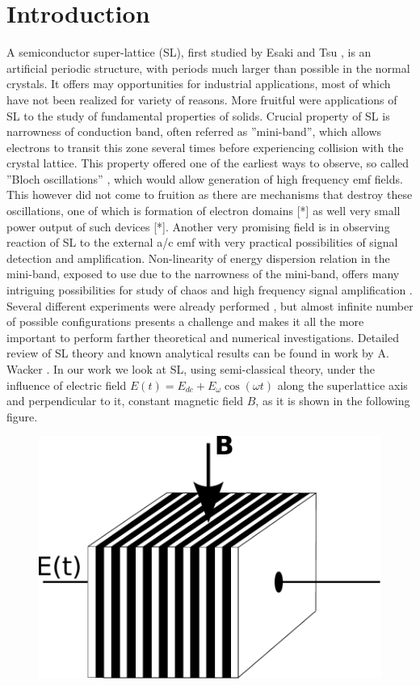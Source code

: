 \documentclass[40pt,letterpaper,physrev]{article}
\begin{document}
  \section{Introduction}  
A semiconductor super-lattice (SL), first studied by Esaki and Tsu \cite{Esaki:70}, is an artificial periodic structure, with periods
much larger than possible in the normal crystals. It offers may opportunities for industrial applications, most of which
have not been realized for variety of reasons. More fruitful were applications of SL to the study of fundamental
properties of solids. Crucial property of SL is narrowness of conduction band, often referred as ”mini-band”, which
allows electrons to transit this zone several times before experiencing collision with the crystal lattice. This property
offered one of the earliest ways to observe, so called ”Bloch oscillations” \cite{BLOCH}, which would allow generation of
high frequency emf fields. This however did not come to fruition as there are mechanisms that destroy these oscillations,
one of which is formation of electron domains [*] as well very small power output of such devices [*].
Another very promising field is in observing reaction of SL to the external a/c emf with very practical possibilities
of signal detection and amplification. Non-linearity of energy dispersion relation in the mini-band, exposed to use due
to the narrowness of the mini-band, offers many intriguing possibilities for study of chaos \cite{Alekseev2002281} and 
high frequency signal amplification \cite{PhysRevB.77.165330}. Several different experiments were already 
performed \cite{PhysRevB.56.10303}, but almost infinite number of possible configurations presents a challenge and makes 
it all the more important to perform farther theoretical and numerical investigations. Detailed review of SL theory and 
known analytical results can be found in work by A. Wacker \cite{WAC01}.
In our work we look at SL, using semi-classical theory, under the influence of electric field 
$E(t) = E_{dc} + E_{\omega}\cos(\omega t)$ along the superlattice axis and perpendicular to it, constant magnetic field $B$, as it
is shown in the following figure.
  	\begin{figure}[H]
	  \centering
	  \normalsize %
	  \includegraphics[scale=0.7]{illustrations/SL_CROSS_E_AND_B.pdf}
	  \caption{}
	\end{figure}
\end{document}
